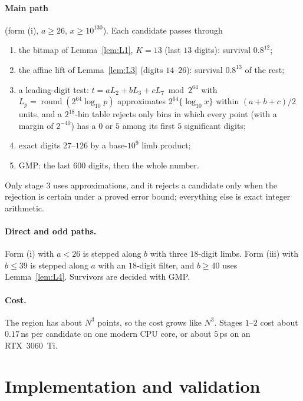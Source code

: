 \documentclass[11pt]{article}
\theoremstyle{definition}
\begin{document}
\paragraph{Main path} (form (i), $a\ge26$, $x\ge10^{130}$). Each candidate passes through
\begin{enumerate}
\item the bitmap of Lemma~\ref{lem:L1}, $K=13$ (last $13$ digits): survival $0.8^{12}$;
\item the affine lift of Lemma~\ref{lem:L3} (digits $14$--$26$): survival $0.8^{13}$ of the rest;
\item a leading-digit test: $t=aL_2+bL_3+cL_7\bmod 2^{64}$ with $L_p=\operatorname{round}(2^{64}\log_{10}p)$ approximates
  $2^{64}\{\log_{10}x\}$ within $(a+b+c)/2$ units, and a $2^{18}$-bin table rejects only bins in which every point (with
  a margin of $2^{-40}$) has a $0$ or $5$ among its first $5$ significant digits;
\item exact digits $27$--$126$ by a base-$10^9$ limb product;
\item GMP: the last $600$ digits, then the whole number.
\end{enumerate}
Only stage 3 uses approximations, and it rejects a candidate only when the rejection is certain under a proved error
bound; everything else is exact integer arithmetic.

\paragraph{Direct and odd paths.} Form (i) with $a<26$ is stepped along $b$ with three $18$-digit limbs. Form (iii) with
$b\le39$ is stepped along $a$ with an $18$-digit filter, and $b\ge40$ uses Lemma~\ref{lem:L4}. Survivors are decided
with GMP.

\paragraph{Cost.} The region has about $N^3$ points, so the cost grows like $N^3$. Stages $1$--$2$ cost about
$0.17$\,ns per candidate on one modern CPU core, or about $5$\,ps on an RTX~3060~Ti.

\section{Implementation and validation}\label{sec:validation}
\end{document}
